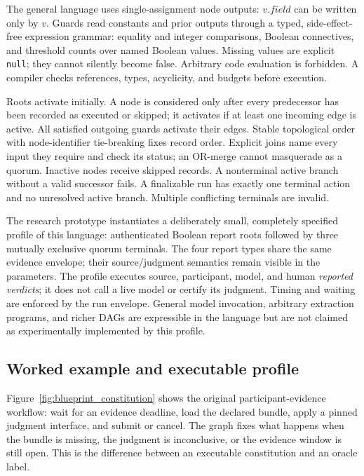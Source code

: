 \documentclass[10pt]{article}
\begin{document}
The general language uses single-assignment node outputs: $v.\textit{field}$ can be written only by $v$. Guards read constants and prior outputs through a typed, side-effect-free expression grammar: equality and integer comparisons, Boolean connectives, and threshold counts over named Boolean values. Missing values are explicit \texttt{null}; they cannot silently become false. Arbitrary code evaluation is forbidden. A compiler checks references, types, acyclicity, and budgets before execution.

Roots activate initially. A node is considered only after every predecessor has been recorded as executed or skipped; it activates if at least one incoming edge is active. All satisfied outgoing guards activate their edges. Stable topological order with node-identifier tie-breaking fixes record order. Explicit joins name every input they require and check its status; an OR-merge cannot masquerade as a quorum. Inactive nodes receive skipped records. A nonterminal active branch without a valid successor fails. A finalizable run has exactly one terminal action and no unresolved active branch. Multiple conflicting terminals are invalid.

The research prototype instantiates a deliberately small, completely specified profile of this language: authenticated Boolean report roots followed by three mutually exclusive quorum terminals. The four report types share the same evidence envelope; their source/judgment semantics remain visible in the parameters. The profile executes source, participant, model, and human \emph{reported verdicts}; it does not call a live model or certify its judgment. Timing and waiting are enforced by the run envelope. General model invocation, arbitrary extraction programs, and richer DAGs are expressible in the language but are not claimed as experimentally implemented by this profile.

\subsection{Worked example and executable profile}

Figure~\ref{fig:blueprint_constitution} shows the original participant-evidence workflow: wait for an evidence deadline, load the declared bundle, apply a pinned judgment interface, and submit or cancel. The graph fixes what happens when the bundle is missing, the judgment is inconclusive, or the evidence window is still open. This is the difference between an executable constitution and an oracle label.
\end{document}
